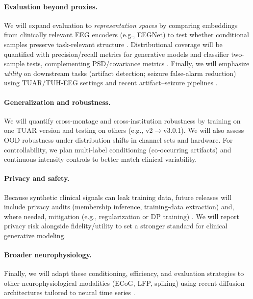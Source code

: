 \documentclass{article}
\begin{document}
\paragraph{Evaluation beyond proxies.}
We will expand evaluation to \emph{representation spaces} by comparing embeddings from clinically relevant EEG encoders (e.g., EEGNet) to test whether conditional samples preserve task-relevant structure \citep{lawhern2018eegnetcompact}. Distributional coverage will be quantified with precision/recall metrics for generative models and classifier two-sample tests, complementing PSD/covariance metrics \citep{kynkaanniemi2019improvedprecision,lopezpaz2017revisitingclassifier}. Finally, we will emphasize \emph{utility} on downstream tasks (artifact detection; seizure false-alarm reduction) using TUAR/TUH-EEG settings and recent artifact–seizure pipelines \citep{ingolfsson2022energyefficient,obeid2016tuh,hamid2020tuar,vetter2024generatingrealistic}.

\paragraph{Generalization and robustness.}
We will quantify cross-montage and cross-institution robustness by training on one TUAR version and testing on others (e.g., v2$\rightarrow$v3.0.1). We will also assess OOD robustness under distribution shifts in channel sets and hardware. For controllability, we plan multi-label conditioning (co-occurring artifacts) and continuous intensity controls to better match clinical variability.

\paragraph{Privacy and safety.}
Because synthetic clinical signals can leak training data, future releases will include privacy audits (membership inference, training-data extraction) and, where needed, mitigation (e.g., regularization or DP training) \citep{carlini2019secretsharer,carlini2023extractingtraining,duan2023arevulnerable,matsumoto2023membershipinference}. We will report privacy risk alongside fidelity/utility to set a stronger standard for clinical generative modeling.

\paragraph{Broader neurophysiology.}
Finally, we will adapt these conditioning, efficiency, and evaluation strategies to other neurophysiological modalities (ECoG, LFP, spiking) using recent diffusion architectures tailored to neural time series \citep{vetter2024generatingrealistic}.
\end{document}
